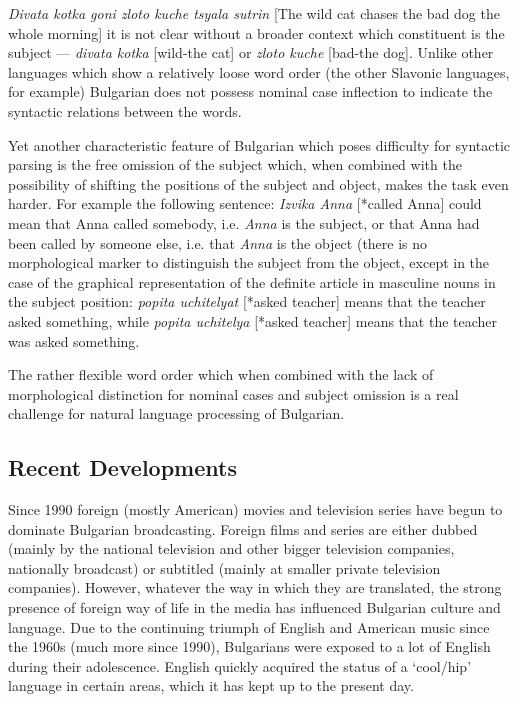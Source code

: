 \begin{multicols}{2}
 \textit{{Divata kotka goni zloto kuche tsyala sutrin}} [The wild cat chases the bad dog the whole morning] it is not clear without a broader context which constituent is the subject — \textit{{divata kotka}} [wild-the cat] or \textit{{zloto kuche}} [bad-the dog]. Unlike other languages which show a relatively loose word order (the other Slavonic languages, for example) Bulgarian does not possess nominal case inflection to indicate the syntactic relations between the words.

Yet another characteristic feature of Bulgarian which poses difficulty for syntactic parsing is the free omission of the subject which, when combined with the possibility of shifting the positions of the subject and object, makes the task even harder. For example the following sentence: \textit{{Izvika Anna}} [*called Anna] could mean that Anna called somebody, i.e.  \textit{Anna} is the subject, or that Anna had been called by someone else, i.e. that  \textit{Anna} is the object (there is no morphological marker to distinguish the subject from the object, except in the case of the graphical representation of the definite article in masculine nouns in the subject position: \textit{{popita uchitelyat}} [*asked teacher] means that the teacher asked something, while \textit{{popita uchitelya}} [*asked teacher] means that the teacher was asked something. 

The rather flexible word order which when combined with the lack of morphological distinction for nominal cases and subject omission is a real challenge for natural language processing of Bulgarian.

\subsection{Recent Developments}

Since 1990 foreign (mostly American) movies and television series have begun to dominate Bulgarian broadcasting. Foreign films and series are either dubbed (mainly by the national television and other bigger television companies, nationally broadcast) or subtitled (mainly at smaller private television companies). However, whatever the way in which they are translated, the strong presence of foreign way of life in the media has influenced Bulgarian culture and language. Due to the continuing triumph of English and American music since the 1960s (much more since 1990), Bulgarians were exposed to a lot of English during their adolescence. English quickly acquired the status of a ‘cool/hip’ language in certain areas, which it has kept up to the present day. 


\end{multicols}
